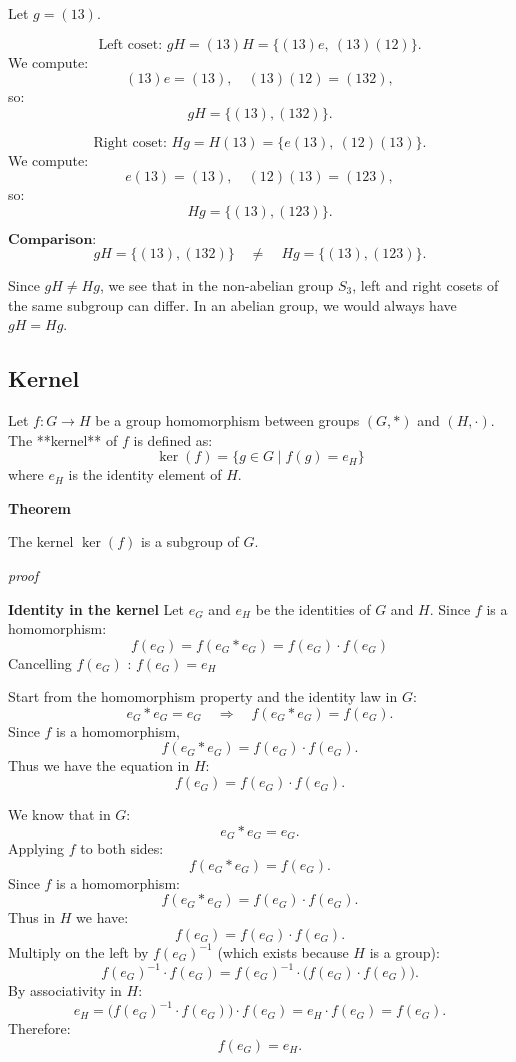 \documentclass[12pt]{article}
\begin{document}
Let $g = (13)$.

$$
\text{Left coset: } gH = (13)H = \{ (13)e, \ (13)(12) \}.
$$
We compute:
$$
(13)e = (13), \quad (13)(12) = (132),
$$
so:
$$
gH = \{ (13), (132) \}.
$$


$$
\text{Right coset: } Hg = H(13) = \{ e(13), \ (12)(13) \}.
$$
We compute:
$$
e(13) = (13), \quad (12)(13) = (123),
$$
so:
$$
Hg = \{ (13), (123) \}.
$$

$\textbf{Comparison:}$  
$$
gH = \{ (13), (132) \} \quad \neq \quad Hg = \{ (13), (123) \}.
$$

Since $gH \neq Hg$, we see that in the non-abelian group $S_3$, left and right cosets of the same subgroup can differ.  
In an abelian group, we would always have $gH = Hg$.



\subsection*{Kernel}

Let $f: G \to H$ be a group homomorphism between groups $(G, *)$ and $(H, \cdot)$.  
The **kernel** of $f$ is defined as:
$$
\ker(f) = \{ g \in G \mid f(g) = e_H \}
$$
where $e_H$ is the identity element of $H$.

\textbf{Theorem}

The kernel $\ker(f)$ is a subgroup of $G$.


\textit{proof}

\textbf{Identity in the kernel} 
Let $e_G$ and $e_H$ be the identities of $G$ and $H$.  
Since $f$ is a homomorphism:
$$
f(e_G) = f(e_G * e_G) = f(e_G) \cdot f(e_G)
$$
Cancelling $f(e_G)$ : $f(e_G) = e_H$

Start from the homomorphism property and the identity law in \(G\):
$$
e_G * e_G = e_G \quad \Rightarrow \quad f(e_G * e_G) = f(e_G).
$$
Since \(f\) is a homomorphism,
$$
f(e_G * e_G) = f(e_G)\cdot f(e_G).
$$
Thus we have the equation in \(H\):
$$
f(e_G) = f(e_G)\cdot f(e_G).
$$

We know that in $G$:
$$
e_G * e_G = e_G.
$$
Applying $f$ to both sides:
$$
f(e_G * e_G) = f(e_G).
$$
Since $f$ is a homomorphism:
$$
f(e_G * e_G) = f(e_G) \cdot f(e_G).
$$
Thus in $H$ we have:
$$
f(e_G) = f(e_G) \cdot f(e_G).
$$
Multiply on the left by $f(e_G)^{-1}$ (which exists because $H$ is a group):
$$
f(e_G)^{-1} \cdot f(e_G) = f(e_G)^{-1} \cdot \big(f(e_G) \cdot f(e_G)\big).
$$
By associativity in $H$:
$$
e_H = \big(f(e_G)^{-1} \cdot f(e_G)\big) \cdot f(e_G) = e_H \cdot f(e_G) = f(e_G).
$$
Therefore:
$$
f(e_G) = e_H.
$$
\end{document}
